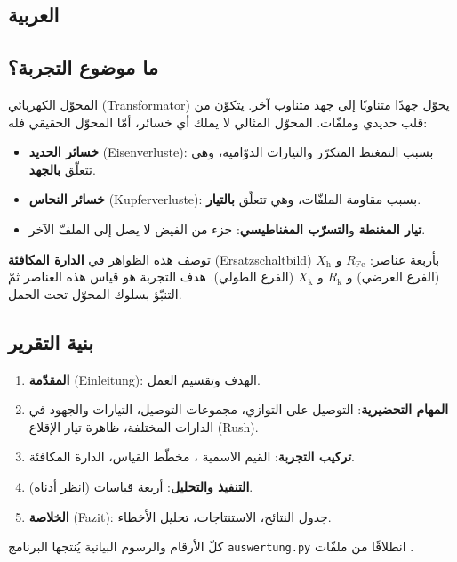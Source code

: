 \documentclass[a4paper,11pt]{article}
\providecommand{\textLR}[1]{\LR{#1}}
\begin{document}
\newpage
\begin{Arabic}
\section{العربية}

\subsection{ما موضوع التجربة؟}
المحوّل الكهربائي (\textgerman{Transformator}) يحوّل جهدًا متناوبًا إلى جهد متناوب آخر. يتكوّن من قلب حديدي وملفّات. المحوّل المثالي لا يملك أي خسائر، أمّا المحوّل الحقيقي فله:
\begin{itemize}[nosep]
  \item \textbf{خسائر الحديد} (\textgerman{Eisenverluste}): بسبب التمغنط المتكرّر والتيارات الدوّامية، وهي تتعلّق \textbf{بالجهد}.
  \item \textbf{خسائر النحاس} (\textgerman{Kupferverluste}): بسبب مقاومة الملفّات، وهي تتعلّق \textbf{بالتيار}.
  \item \textbf{تيار المغنطة} و\textbf{التسرّب المغناطيسي}: جزء من الفيض لا يصل إلى الملفّ الآخر.
\end{itemize}
توصف هذه الظواهر في \textbf{الدارة المكافئة} (\textgerman{Ersatzschaltbild}) بأربعة عناصر: $R_\mathrm{Fe}$ و $X_\mathrm{h}$ (الفرع العرضي) و $R_\mathrm{k}$ و $X_\mathrm{k}$ (الفرع الطولي). هدف التجربة هو قياس هذه العناصر ثمّ التنبّؤ بسلوك المحوّل تحت الحمل.

\subsection{بنية التقرير}
\begin{enumerate}[nosep]
  \item \textbf{المقدّمة} (\textgerman{Einleitung}): الهدف وتقسيم العمل.
  \item \textbf{المهام التحضيرية}: التوصيل على التوازي، مجموعات التوصيل، التيارات والجهود في الدارات المختلفة، ظاهرة تيار الإقلاع (\textgerman{Rush}).
  \item \textbf{تركيب التجربة}: القيم الاسمية \textLR{(220\,V, 45{,}5\,A, 30\,kVA)}، مخطّط القياس، الدارة المكافئة.
  \item \textbf{التنفيذ والتحليل}: أربعة قياسات (انظر أدناه).
  \item \textbf{الخلاصة} (\textgerman{Fazit}): جدول النتائج، الاستنتاجات، تحليل الأخطاء.
\end{enumerate}
كلّ الأرقام والرسوم البيانية يُنتجها البرنامج \textgerman{\texttt{auswertung.py}} انطلاقًا من ملفّات \textLR{CSV}.


\end{Arabic}
\end{document}
